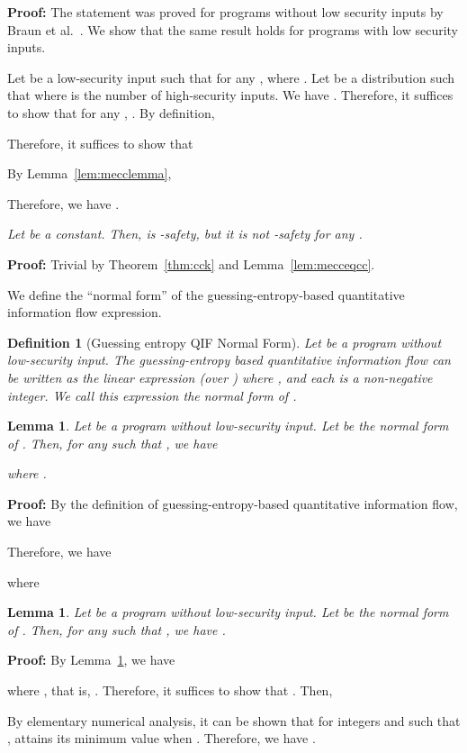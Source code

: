 \documentclass{llncs}
\newtheorem{definition}[theorem]{Definition}
\newtheorem{lemma}[theorem]{Lemma}
\newenvironment{proof}{\noindent\rm{\bf Proof:}}{\hbox{}\vspace*{0.2\baselineskip}}
\newenvironment{reflemma}[1]{\begin{trivlist}\item[\hskip
      \labelsep{\bf Lemma #1.}]\it}{\end{trivlist}}
\newenvironment{reftheorem}[1]{\begin{trivlist}\item[\hskip
      \labelsep{\bf Theorem #1.}]\it}{\end{trivlist}}
\begin{document}
\begin{reflemma}{\ref{lem:mecceqcc}}

\end{reflemma}
\begin{proof}
The statement was proved for programs without low security inputs by
Braun et al.~\cite{Braun:09:MFPS}.  We show that the same result holds
for programs with low security inputs.

Let  be a low-security input such that for any ,
 where .
Let  be a distribution such that
 where  is the
number of high-security inputs.  We have .  Therefore, it suffices to show that for
any , .  By definition,

Therefore, it suffices to show that

By Lemma~\ref{lem:mecclemma},

Therefore, we have .
\end{proof}

\begin{reftheorem}{\ref{thm:mecck}}
  Let  be a constant.  Then,  is
  -safety, but it is not -safety for any .
\end{reftheorem}
\begin{proof}
Trivial by Theorem~\ref{thm:cck} and Lemma~\ref{lem:mecceqcc}.
\end{proof}

We define the ``normal form'' of the guessing-entropy-based quantitative
information flow expression.
\begin{definition}[Guessing entropy QIF Normal Form]
Let  be a program without low-security input.  The guessing-entropy
based quantitative information flow  can be written
as the linear expression (over )  where , and each
 is a non-negative integer.  We call this expression  the {\em normal form} of .
\end{definition}

\begin{lemma}
\label{lem:gecc1}
Let  be a program without low-security input.  Let  be the normal form of .  Then, for any
 such that , we have 

where .
\end{lemma}
\begin{proof}
  By the definition of guessing-entropy-based quantitative information
  flow, we have 

Therefore, we have

where 
\end{proof}

\begin{lemma}
\label{lem:gecc2}
Let  be a program without low-security input.  Let  be the normal form of .  Then, for any
 such that , we have .
\end{lemma}
\begin{proof}
  By Lemma~\ref{lem:gecc1}, we have 

 where , that is, .  Therefore,
 it suffices to show that .  Then,

By elementary numerical analysis, it can be shown that for integers
 and  such that ,  attains its minimum value  when .
Therefore, we have .
\end{proof}
\end{document}
